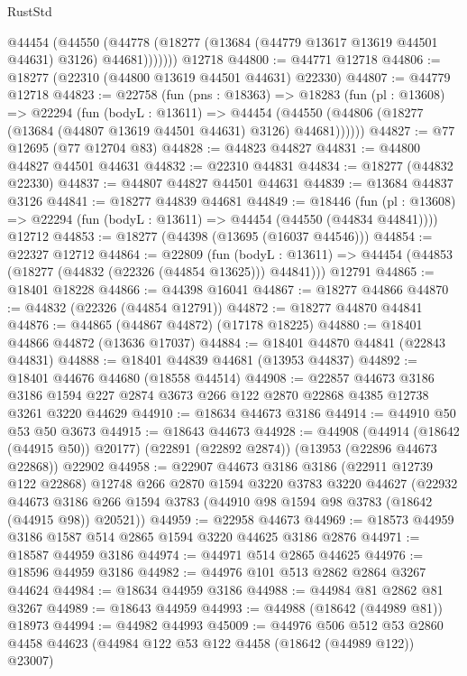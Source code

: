 \begin{lexlean}{RustStd}
\begin{coremodule}
          @44454
            (@44550
              (@44778 (@18277 (@13684 (@44779 @13617 @13619 @44501 @44631) @3126) @44681)))))))
    @12718
@44800 := @44771 @12718
@44806 := @18277 (@22310 (@44800 @13619 @44501 @44631) @22330)
@44807 := @44779 @12718
@44823 := @22758
    (fun (pns : @18363) =>
    @18283
      (fun (pl : @13608) =>
      @22294
        (fun (bodyL : @13611) =>
        @44454 (@44550 (@44806 (@18277 (@13684 (@44807 @13619 @44501 @44631) @3126) @44681))))))
@44827 := @77 @12695 (@77 @12704 @83)
@44828 := @44823 @44827
@44831 := @44800 @44827 @44501 @44631
@44832 := @22310 @44831
@44834 := @18277 (@44832 @22330)
@44837 := @44807 @44827 @44501 @44631
@44839 := @13684 @44837 @3126
@44841 := @18277 @44839 @44681
@44849 := @18446
    (fun (pl : @13608) => @22294 (fun (bodyL : @13611) => @44454 (@44550 (@44834 @44841))))
    @12712
@44853 := @18277 (@44398 (@13695 (@16037 @44546)))
@44854 := @22327 @12712
@44864 := @22809
    (fun (bodyL : @13611) => @44454 (@44853 (@18277 (@44832 (@22326 (@44854 @13625))) @44841)))
    @12791
@44865 := @18401 @18228
@44866 := @44398 @16041
@44867 := @18277 @44866
@44870 := @44832 (@22326 (@44854 @12791))
@44872 := @18277 @44870 @44841
@44876 := @44865 (@44867 @44872) (@17178 @18225)
@44880 := @18401 @44866 @44872 (@13636 @17037)
@44884 := @18401 @44870 @44841 (@22843 @44831)
@44888 := @18401 @44839 @44681 (@13953 @44837)
@44892 := @18401 @44676 @44680 (@18558 @44514)
@44908 := @22857
    @44673
    @3186
    @3186
    @1594
    @227
    @2874
    @3673
    @266
    @122
    @2870
    @22868
    @4385
    @12738
    @3261
    @3220
    @44629
@44910 := @18634 @44673 @3186
@44914 := @44910 @50 @53 @50 @3673
@44915 := @18643 @44673
@44928 := @44908
    (@44914 (@18642 (@44915 @50)) @20177)
    (@22891 (@22892 @2874))
    (@13953 (@22896 @44673 @22868))
    @22902
@44958 := @22907
    @44673
    @3186
    @3186
    (@22911 @12739 @122 @22868)
    @12748
    @266
    @2870
    @1594
    @3220
    @3783
    @3220
    @44627
    (@22932 @44673 @3186 @266 @1594 @3783 (@44910 @98 @1594 @98 @3783 (@18642 (@44915 @98)) @20521))
@44959 := @22958 @44673
@44969 := @18573 @44959 @3186 @1587 @514 @2865 @1594 @3220 @44625 @3186 @2876
@44971 := @18587 @44959 @3186
@44974 := @44971 @514 @2865 @44625
@44976 := @18596 @44959 @3186
@44982 := @44976 @101 @513 @2862 @2864 @3267 @44624
@44984 := @18634 @44959 @3186
@44988 := @44984 @81 @2862 @81 @3267
@44989 := @18643 @44959
@44993 := @44988 (@18642 (@44989 @81)) @18973
@44994 := @44982 @44993
@45009 := @44976
    @506
    @512
    @53
    @2860
    @4458
    @44623
    (@44984 @122 @53 @122 @4458 (@18642 (@44989 @122)) @23007)

\end{coremodule}
\end{lexlean}
